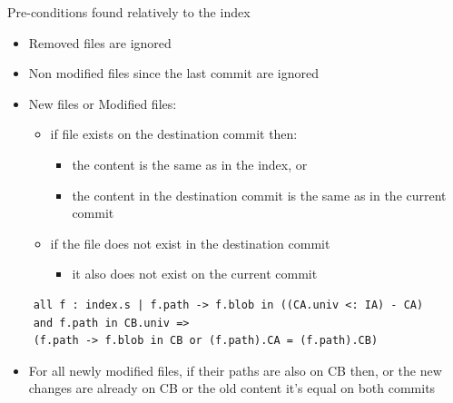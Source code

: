 \documentclass{beamer}
\begin{document}
\begin{frame}
   \begin{block}{Pre-conditions found relatively to the index}
      \begin{itemize}
         \item Removed files are ignored
         \item Non modified files since the last commit are ignored
         \item New files or Modified files:
            \begin{itemize}
               \item if file exists on the destination commit then:
                  \begin{itemize}
                     \item the content is the same as in the index, or
                     \item the content in 
		     the destination commit is the same as in the current commit
                  \end{itemize}
               \item if the file does not exist in the destination commit
                  \begin{itemize}
                     \item it also does not exist on the current commit
                  \end{itemize}
            \end{itemize}
      \end{itemize}
   \end{block}
\end{frame}

\begin{frame}[fragile]
	\scriptsize
	\begin{lstlisting}	
	all f : index.s | f.path -> f.blob in ((CA.univ <: IA) - CA) 
	and f.path in CB.univ => 
	(f.path -> f.blob in CB or (f.path).CA = (f.path).CB)
	\end{lstlisting}
	\normalsize
	\begin{itemize}
	\item For all newly modified files, if their paths are also on CB then, or the
	new changes are already on CB or the old content it's equal on both
	commits
	\end{itemize}

\end{frame}
\end{document}
